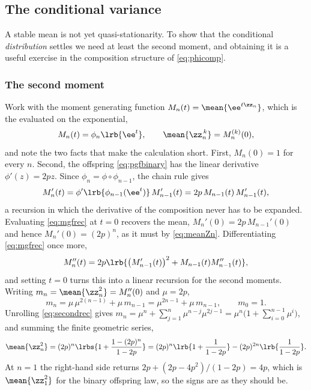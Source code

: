 \subsection{The conditional variance}
\label{sec:variance}

A stable mean is not yet quasi-stationarity. To show that the conditional
\emph{distribution} settles we need at least the second moment, and obtaining it is a
useful exercise in the composition structure of \cref{eq:phicomp}.

\subsubsection{The second moment}

Work with the moment generating function $M_n(t) = \mean{\ee^{t\zz_n}}$, which is the
\pgf{} evaluated on the exponential,
\begin{equation}
\label{eq:mgfdef}
M_n(t) = \phi_n\lrb{\ee^{t}},
\qquad
\mean{\zz_n^{\,k}} = M_n^{(k)}(0),
\end{equation}
and note the two facts that make the calculation short. First, $M_n(0)=1$ for every $n$.
Second, the offspring \pgf{} \cref{eq:pgfbinary} has the linear derivative
$\phi'(z) = 2pz$. Since $\phi_n = \phi\circ\phi_{n-1}$, the chain rule gives
\begin{equation}
\label{eq:mgfrec}
M_n'(t) = \phi'\lrb{\phi_{n-1}(\ee^t)}\,M_{n-1}'(t) = 2p\,M_{n-1}(t)\,M_{n-1}'(t),
\end{equation}
a recursion in which the derivative of the composition never has to be expanded.
Evaluating \cref{eq:mgfrec} at $t=0$ recovers the mean, $M_n'(0) = 2p\,M_{n-1}'(0)$ and
hence $M_n'(0) = (2p)^n$, as it must by \cref{eq:meanZn}. Differentiating
\cref{eq:mgfrec} once more,
\begin{equation*}
M_n''(t) = 2p\lrb{\bigl(M_{n-1}'(t)\bigr)^2 + M_{n-1}(t)M_{n-1}''(t)},
\end{equation*}
and setting $t=0$ turns this into a linear recursion for the second moments. Writing
$m_n = \mean{\zz_n^2} = M_n''(0)$ and $\mu=2p$,
\begin{equation}
\label{eq:secondrec}
m_n = \mu\,\mu^{2(n-1)} + \mu\,m_{n-1} = \mu^{2n-1} + \mu\,m_{n-1},
\qquad m_0 = 1 .
\end{equation}
Unrolling \cref{eq:secondrec} gives $m_n = \mu^n + \sum_{j=1}^{n}\mu^{n-j}\mu^{2j-1}
= \mu^n\bigl(1+\sum_{i=0}^{n-1}\mu^i\bigr)$, and summing the finite geometric series,
\begin{equation}
\label{eq:secondMoment}
\mean{\zz_n^2}
= (2p)^n\lrbs{1 + \frac{1-(2p)^n}{1-2p}}
= (2p)^n\lrb{1+\frac{1}{1-2p}} - (2p)^{2n}\lrb{\frac{1}{1-2p}} .
\end{equation}
At $n=1$ the right-hand side returns $2p + (2p-4p^2)/(1-2p) = 4p$, which is
$\mean{\zz_1^2}$ for the binary offspring law, so the signs are as they should be.

